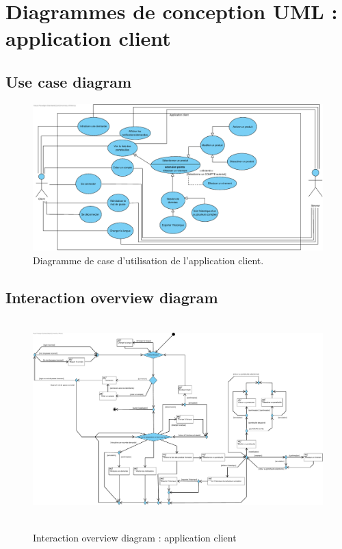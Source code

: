 \documentclass[]{report}
\begin{document}
\newpage




\section{Diagrammes de conception UML : application client}



\subsection{Use case diagram}



\begin{figure}[h]
	\centering\includegraphics[width=\linewidth]{img/Use Case Client.pdf}
	\caption{Diagramme de case d'utilisation de l'application client.}
\end{figure}

\newpage

\subsection{Interaction overview diagram}



\begin{figure}[h!]
\hbox{
	\centering\includegraphics[width=\linewidth]{img/Interaction Overview Client.pdf}
}
\caption{Interaction overview diagram : application client}
\end{figure}
\end{document}
